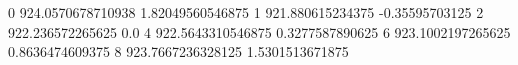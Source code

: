 0 924.0570678710938 1.82049560546875
1 921.880615234375 -0.35595703125
2 922.236572265625 0.0
4 922.5643310546875 0.3277587890625
6 923.1002197265625 0.8636474609375
8 923.7667236328125 1.5301513671875
